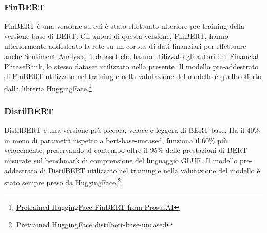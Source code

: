 \subsubsection{FinBERT}
FinBERT \cite{araci2019finbert} è una versione su cui è stato effettuato ulteriore pre-training della versione base di BERT. Gli autori di questa versione, FinBERT, hanno ulteriormente addestrato la rete su un corpus di dati finanziari per effettuare anche Sentiment Analysis, il dataset che hanno utilizzato gli autori è il Financial PhraseBank, lo stesso dataset utilizzato nella presente. 
Il modello pre-addestrato di FinBERT utilizzato nel training e nella valutazione del modello è quello offerto dalla libreria HuggingFace.\footnote{\href{https://huggingface.co/ProsusAI/finbert}{Pretrained HuggingFace FinBERT from ProsusAI}}  

    
\subsubsection{DistilBERT}
DistilBERT \cite{sanh2020distilbert} è una versione più piccola, veloce e leggera di BERT base. Ha il 40\% in meno di parametri rispetto a bert-base-uncased, funziona il 60\% più velocemente, preservando al contempo oltre il 95\% delle prestazioni di BERT misurate sul benchmark di comprensione del linguaggio GLUE. Il modello pre-addestrato di DistilBERT utilizzato nel training e nella valutazione del modello è stato sempre preso da HuggingFace.\footnote{\href{https://huggingface.co/distilbert-base-uncased}{Pretrained HuggingFace distilbert-base-uncased}}  
\newpage



